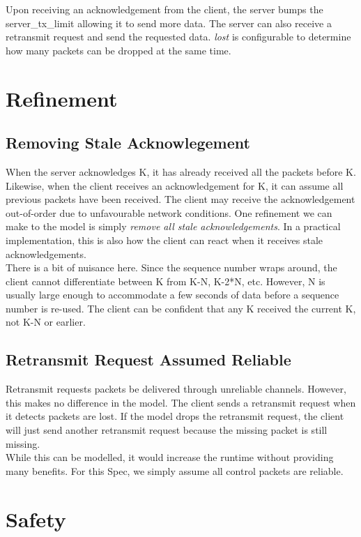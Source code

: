 Upon receiving an acknowledgement from the client, the server bumps the
server\_tx\_limit allowing it to send more data. The server can also receive a 
retransmit request and send the requested data. \textit{lost} is configurable to
determine how many packets can be dropped at the same time.

\section{Refinement}

\subsection{Removing Stale Acknowlegement}

When the server acknowledges K, it has already received all the packets before
K. Likewise, when the client receives an acknowledgement for K, it can assume all
previous packets have been received. The client may receive the
acknowledgement out-of-order due to unfavourable network conditions. One
refinement we can make to the model is simply \textit{remove all stale
acknowledgements}. In a practical implementation, this is also how the client
can react when it receives stale acknowledgements.\\

There is a bit of nuisance here. Since the sequence number wraps around, the
client cannot differentiate between K from K-N, K-2*N, etc. However, N
is usually large enough to accommodate a few seconds of data before a sequence
number is re-used. The client can be confident that any K received the current
K, not K-N or earlier.

\subsection{Retransmit Request Assumed Reliable}

Retransmit requests packets be delivered through unreliable
channels. However, this makes no difference in the model. The client sends
a retransmit request when it detects packets are lost. If the model drops the
retransmit request, the client will just send another retransmit request because
the missing packet is still missing.\\

While this can be modelled, it would increase the runtime without providing many benefits. For this Spec, we simply assume all control packets are reliable. 
\section{Safety}

